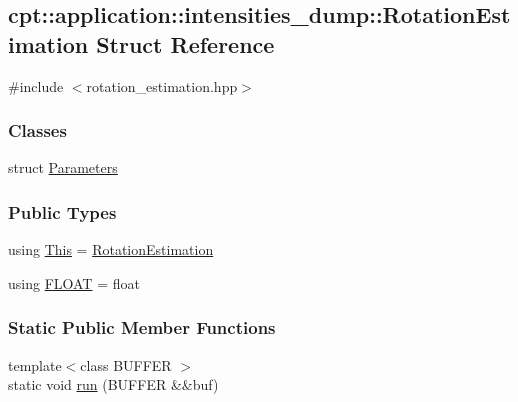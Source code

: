 \hypertarget{structcpt_1_1application_1_1intensities__dump_1_1_rotation_estimation}{\subsection{cpt\-:\-:application\-:\-:intensities\-\_\-dump\-:\-:Rotation\-Estimation Struct Reference}
\label{structcpt_1_1application_1_1intensities__dump_1_1_rotation_estimation}
}


{\ttfamily \#include $<$rotation\-\_\-estimation.\-hpp$>$}

\subsubsection*{Classes}
\begin{DoxyCompactItemize}
\item 
struct \hyperlink{structcpt_1_1application_1_1intensities__dump_1_1_rotation_estimation_1_1_parameters}{Parameters}
\end{DoxyCompactItemize}
\subsubsection*{Public Types}
\begin{DoxyCompactItemize}
\item 
using \hyperlink{structcpt_1_1application_1_1intensities__dump_1_1_rotation_estimation_ab68f18e062c77c11672184fe92ef597e}{This} = \hyperlink{structcpt_1_1application_1_1intensities__dump_1_1_rotation_estimation}{Rotation\-Estimation}
\item 
using \hyperlink{structcpt_1_1application_1_1intensities__dump_1_1_rotation_estimation_af435b98c452d97b9822c0c4c937b255e}{F\-L\-O\-A\-T} = float
\end{DoxyCompactItemize}
\subsubsection*{Static Public Member Functions}
\begin{DoxyCompactItemize}
\item 
{\footnotesize template$<$class B\-U\-F\-F\-E\-R $>$ }\\static void \hyperlink{structcpt_1_1application_1_1intensities__dump_1_1_rotation_estimation_a85ed7d1cd137388156365a6985d77c36}{run} (B\-U\-F\-F\-E\-R \&\&buf)
\end{DoxyCompactItemize}


